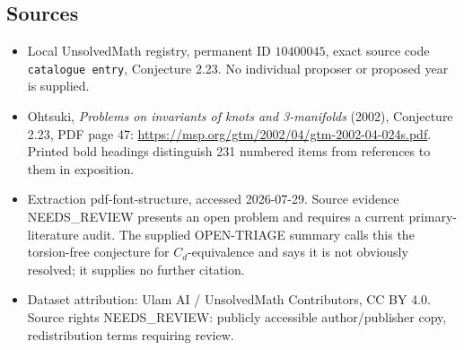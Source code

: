 \documentclass[11pt]{article}
\begin{document}
\subsection{Sources}
\begin{itemize}
\item Local UnsolvedMath registry, permanent ID \(10400045\), exact source code \texttt{catalogue entry}, Conjecture 2.23. No individual proposer or proposed year is supplied.
\item Ohtsuki, \emph{Problems on invariants of knots and 3-manifolds} (2002), Conjecture 2.23, PDF page 47: \url{https://msp.org/gtm/2002/04/gtm-2002-04-024s.pdf}. Printed bold headings distinguish 231 numbered items from references to them in exposition.
\item Extraction pdf-font-structure, accessed 2026-07-29. Source evidence NEEDS\_REVIEW presents an open problem and requires a current primary-literature audit. The supplied OPEN-TRIAGE summary calls this the torsion-free conjecture for \(C_d\)-equivalence and says it is not obviously resolved; it supplies no further citation.
\item Dataset attribution: Ulam AI / UnsolvedMath Contributors, CC BY 4.0. Source rights NEEDS\_REVIEW: publicly accessible author/publisher copy, redistribution terms requiring review.
\end{itemize}
\end{document}
